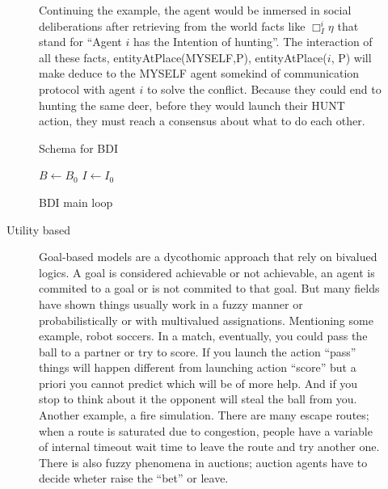 \documentclass[11pt,oneside,a4paper,openright]{report}
\begin{document}
\begin{description}
\begin{description}
		Continuing the example, the agent would be inmersed in social deliberations after retrieving from the
		world facts like $\Box_{I}^i \eta$ that stand for ``Agent $i$ has the Intention of hunting''. The 
		interaction of all these facts, entityAtPlace(MYSELF,P), entityAtPlace($i$, P) will make deduce to the
		MYSELF agent somekind of communication protocol with agent $i$ to solve the conflict. Because they could 
		end to hunting the same deer, before they would launch their HUNT action, they must reach a consensus about
		what to do each other. 

		Schema for BDI	

		\begin{algorithm}[H]
		\SetAlgoLined
		\BlankLine
		$B \gets B_0$\;
		$I \gets I_0$\;
		\caption{BDI main loop}
		\end{algorithm}



		\item[Utility based]

		Goal-based models are a dycothomic approach that rely on bivalued logics. A goal is considered
		achievable or not achievable, an agent is commited to a goal or is not commited to that goal. But
		many fields have shown things usually work in a fuzzy manner or probabilistically or with multivalued
		assignations. Mentioning some example, robot soccers. In a match, eventually, you could pass the 
		ball to a partner or try to score. If you launch the action “pass” things will happen different 
		from launching action “score” but a priori you cannot predict which will be of more help. And if 
		you stop to think about it the opponent will steal the ball from you. Another example, a fire
		simulation. There are many escape routes; when a route is saturated due to congestion, people 
		have a variable of internal timeout wait time to leave the route and try another one. There is also 
		fuzzy phenomena in auctions; auction agents have to decide wheter raise the ``bet'' or leave.


\end{description}
\end{description}
\end{document}
